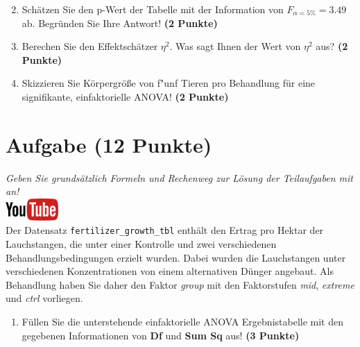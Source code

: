 \documentclass[a4paper, 9pt]{scrartcl}\usepackage[]{graphicx}\usepackage[]{xcolor}
\begin{document}
\vspace{1Ex}

\begin{enumerate}
  \setcounter{enumi}{1}
\item Sch{\"a}tzen Sie den p-Wert der Tabelle mit der Information von
  $F_{\alpha = 5\%} = 3.49$ ab. Begr{\"u}nden Sie Ihre
  Antwort! \textbf{(2 Punkte)}
\item Berechen Sie den Effektsch{\"a}tzer $\eta^2$. Was sagt Ihnen der Wert von
  $\eta^2$ aus? \textbf{(2 Punkte)}
\item Skizzieren Sie K{\"o}rpergr{\"o}{\ss}e von f{"u}nf Tieren pro Behandlung f{\"u}r eine
  signifikante, einfaktorielle ANOVA! \textbf{(2 Punkte)}
\end{enumerate}



 
\clearpage

\section{Aufgabe \hfill (12 Punkte)}

\textit{Geben Sie grunds{\"a}tzlich Formeln und Rechenweg zur L{\"o}sung der
  Teilaufgaben mit an!} \\[1Ex]

\hfill\href{https://youtu.be/49hvImMwVyE}{\includegraphics[width =
  2cm]{img/youtube}}\\[1Ex]




Der Datensatz \texttt{fertilizer\_growth\_tbl} enth{\"a}lt den Ertrag pro Hektar der
Lauchstangen, die unter einer Kontrolle und zwei
verschiedenen Behandlungsbedingungen erzielt wurden. Dabei wurden die
Lauchstangen unter verschiedenen Konzentrationen von einem alternativen
D{\"u}nger angebaut. Als Behandlung haben Sie daher den Faktor \textit{group} mit den
Faktorstufen \textit{mid}, \textit{extreme} und
\textit{ctrl} vorliegen.



\begin{enumerate}
\item F{\"u}llen Sie die unterstehende einfaktorielle ANOVA Ergebnistabelle
  mit den gegebenen Informationen von \textbf{Df} und \textbf{Sum Sq} aus!
  \textbf{(3 Punkte)}
\end{enumerate}
\end{document}

